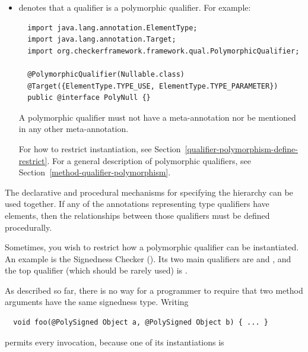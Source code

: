 \begin{itemize}
\item {} denotes that a qualifier is a
  polymorphic qualifier.  For example:

\begin{Verbatim}
  import java.lang.annotation.ElementType;
  import java.lang.annotation.Target;
  import org.checkerframework.framework.qual.PolymorphicQualifier;

  @PolymorphicQualifier(Nullable.class)
  @Target({ElementType.TYPE_USE, ElementType.TYPE_PARAMETER})
  public @interface PolyNull {}
\end{Verbatim}

  A polymorphic qualifier must not have
  a  meta-annotation nor be
  mentioned in any other 
  meta-annotation.

  For how to restrict instantiation, see Section~\ref{qualifier-polymorphism-define-restrict}.
  For a general description of polymorphic qualifiers, see
  Section~\ref{method-qualifier-polymorphism}.

\end{itemize}

The declarative and procedural mechanisms for specifying the hierarchy can
be used together. If any of the annotations representing type qualifiers have elements, then
the relationships between those qualifiers must be defined procedurally.



Sometimes, you wish to restrict how a polymorphic qualifier can be
instantiated.  An example is the Signedness Checker
().  Its two main qualifiers are
 and
, and the top qualifier
(which should be rarely used) is
.

As described so far, there is no way for a programmer to require that two
method arguments have the same signedness type.  Writing

\begin{Verbatim}
  void foo(@PolySigned Object a, @PolySigned Object b) { ... }
\end{Verbatim}

\noindent
permits every invocation, because one of its instantiations is

